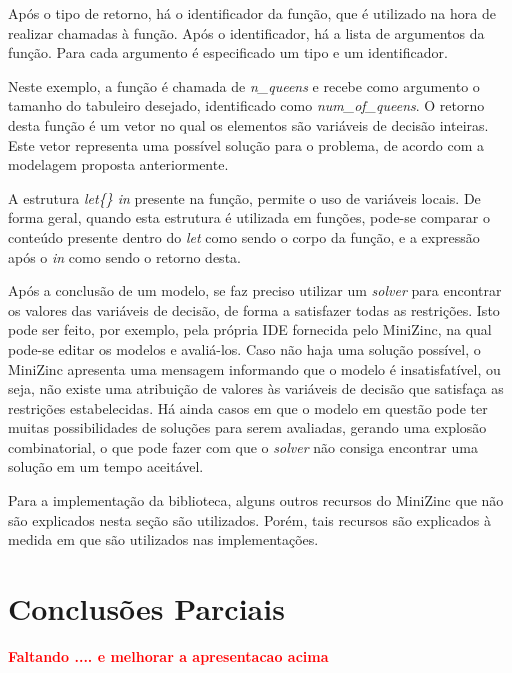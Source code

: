 Após o tipo de retorno, há o identificador da função, que é utilizado na hora de realizar chamadas à função. Após o identificador, há a lista de argumentos da função. Para cada argumento é especificado um tipo e um identificador.

Neste exemplo, a função é chamada de \textit{n\_queens} e recebe como argumento o tamanho do tabuleiro desejado, identificado como \textit{num\_of\_queens}. O retorno desta função é um vetor no qual os elementos são variáveis de decisão inteiras. Este vetor representa uma possível solução para o problema, de acordo com a modelagem proposta anteriormente.

A estrutura \textit{let\{\} in} presente na função, permite o uso de variáveis locais. De forma geral, quando esta estrutura é utilizada em funções, pode-se comparar o conteúdo presente dentro do \textit{let} como sendo o corpo da função, e a expressão após o \textit{in} como sendo o retorno desta.

Após a conclusão de um modelo, se faz preciso utilizar um \textit{solver} para encontrar os valores das variáveis de decisão, de forma a satisfazer todas as restrições. Isto pode ser feito, por exemplo, pela própria IDE fornecida pelo MiniZinc, na qual pode-se editar os modelos e avaliá-los. Caso não haja uma solução possível, o MiniZinc apresenta uma mensagem informando que o modelo é insatisfatível, ou seja, não existe uma atribuição de valores às variáveis de decisão que satisfaça as restrições estabelecidas. Há ainda casos em que o modelo em questão pode ter muitas possibilidades de soluções para serem avaliadas, gerando uma explosão combinatorial, o que pode fazer com que o \textit{solver} não consiga encontrar uma solução em um tempo aceitável.

Para a implementação da biblioteca, alguns outros recursos do MiniZinc que não são explicados nesta seção são utilizados. Porém, tais recursos são explicados à medida em que são utilizados nas implementações.




\section{Conclusões Parciais}
{\bf \textcolor{red}{Faltando .... e melhorar a apresentacao acima}}
